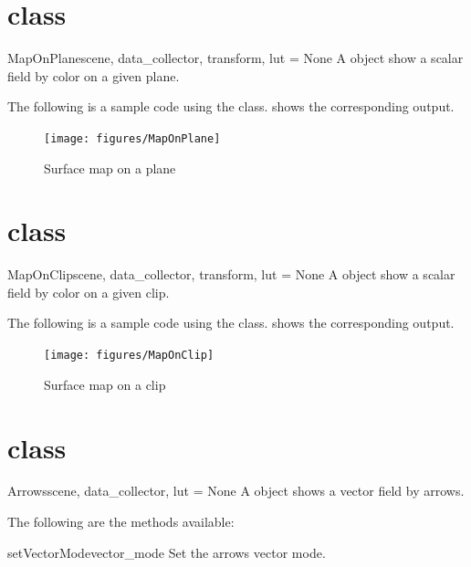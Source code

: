\section{\MapOnPlane class}
\begin{classdesc}{MapOnPlane}{scene, data_collector, transform, lut = None}
A \MapOnPlane object show a scalar field by color on a given plane.
\end{classdesc}

The following is a sample code using the \MapOnPlane class.
 shows the corresponding output. 


\begin{figure}[ht]
\begin{center}
\texttt{[image: figures/MapOnPlane]}
\end{center}
\caption{Surface map on a plane}
\label{fig:maponplane.1}
\end{figure}

\section{\MapOnClip class}
\begin{classdesc}{MapOnClip}{scene, data_collector, transform, lut = None}
A \MapOnClip object show a scalar field by color on a given clip.
\end{classdesc}

The following is a sample code using the \MapOnClip class. 
 shows the corresponding output. 


\begin{figure}[ht]
\begin{center}
\texttt{[image: figures/MapOnClip]}
\end{center}
\caption{Surface map on a clip}
\label{fig:maponclip.1}
\end{figure}

\section{\Arrows class}
\begin{classdesc}{Arrows}{scene, data_collector, lut = None}
A \Arrows object shows a vector field by arrows.
\end{classdesc}

The following are the methods available:
\begin{methoddesc}[Arrows]{setVectorMode}{vector_mode}
Set the arrows vector mode.
\end{methoddesc}

